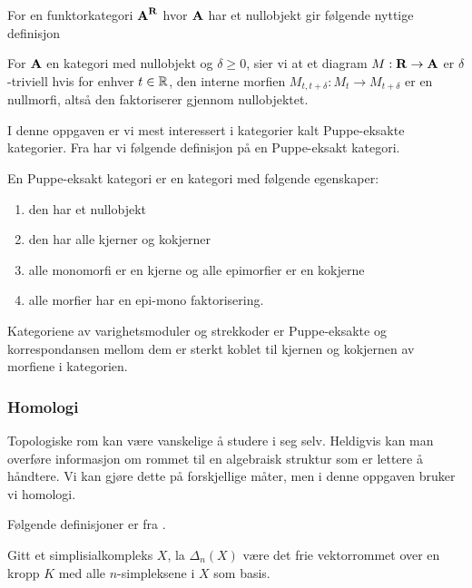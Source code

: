 For en funktorkategori $\textnormal{\textbf{{A}}}^{\textnormal{\textbf{{R}}}}$ hvor $\textnormal{\textbf{{A}}}$ har et
nullobjekt gir \citep[definisjon 1.3]{Bauer2020} følgende
nyttige definisjon 

\begin{definisjon}\label{def:trivialitet}
   For $\textnormal{\textbf{{A}}}$ en kategori med nullobjekt og
   $\delta\geq0$, sier vi at et diagram $M:\textnormal{\textbf{{R}}}\to\textnormal{\textbf{{A}}}$
   er $\delta$-triviell hvis for enhver $t\in\mathbb{R}$, den
   interne morfien $M_{t,t+\delta}: M_t\to M_{t+\delta}$
   er en nullmorfi, altså den faktoriserer gjennom
   nullobjektet.
\end{definisjon}

I denne oppgaven er vi mest interessert i kategorier kalt
Puppe-eksakte kategorier. Fra \citep[definisjon
2.1]{Bauer2020} har vi følgende definisjon på en
  Puppe-eksakt kategori.

\begin{definisjon}\label{def:Puppe-eksakt}
   En Puppe-eksakt kategori er en kategori med følgende
   egenskaper:
  \begin{enumerate}
    \item den har et nullobjekt
    \item den har alle kjerner og kokjerner
    \item alle monomorfi er en kjerne og alle epimorfier
      er en kokjerne
    \item alle morfier har en epi-mono faktorisering.
  \end{enumerate}
\end{definisjon}

Kategoriene av varighetsmoduler og strekkoder er
Puppe-eksakte og korrespondansen mellom dem er sterkt
koblet til kjernen og kokjernen av morfiene i kategorien.

\subsubsection{Homologi}
Topologiske rom kan være vanskelige å studere i seg selv.
Heldigvis kan man overføre informasjon om rommet til en algebraisk
struktur som er lettere å håndtere. Vi kan gjøre dette på
forskjellige måter, men i denne oppgaven bruker vi
homologi. 

Følgende definisjoner er fra \citep[seksjon
2.1]{Hatcher2001}.

\begin{definisjon}\label{def:KjdKomp}
  Gitt et simplisialkompleks $X$, la $\Delta_n(X)$ være
  det frie vektorrommet over en kropp $K$ med alle
  $n$-simpleksene i $X$ som basis.
\end{definisjon}

